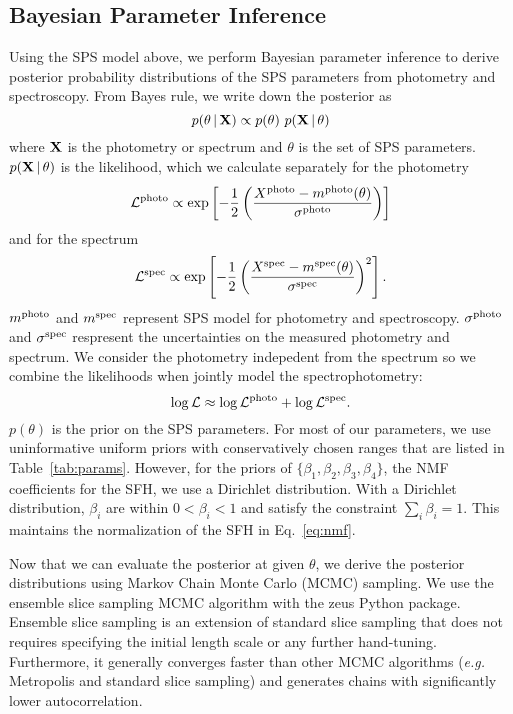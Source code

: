 \subsection{Bayesian Parameter Inference} \label{sec:infer} 
Using the SPS model above, we perform Bayesian parameter inference to derive
posterior probability distributions of the SPS parameters from photometry and
spectroscopy. 
From Bayes rule, we write down the posterior as
\begin{equation} \label{eq:bayes}
    p(\theta\given {\bf X}) \propto p(\theta)~p({\bf X} \given \theta)
\end{equation}
where ${\bf X}$ is the photometry or spectrum and $\theta$ is the set of SPS
parameters. 
$p({\bf X} \,|\, \theta)$ is the likelihood, which we calculate separately for
the photometry
\begin{equation}
    \mathcal{L}^{\rm photo} \propto \exp\left[-\frac{1}{2} \left(\frac{X^{\rm photo} -
    m^{\rm photo}(\theta)}{\sigma^{\rm photo}}\right)\right]
\end{equation}
and for the spectrum
\begin{equation}
    \mathcal{L}^{\rm spec} \propto \exp\left[-\frac{1}{2} \left(\frac{X^{\rm spec} -
    m^{\rm spec}(\theta)}{\sigma^{\rm spec}} \right)^2\right].
\end{equation}
$m^{\rm photo}$ and $m^{\rm spec}$ represent SPS model for photometry and
spectroscopy. 
$\sigma^{\rm photo}$ and $\sigma^{\rm spec}$ respresent the uncertainties on
the measured photometry and spectrum. 
We consider the photometry indepedent from the spectrum so we combine the
likelihoods when jointly model the spectrophotometry: 
\begin{equation}
    \log \mathcal{L} \approx \log \mathcal{L}^{\rm photo} + \log
    \mathcal{L}^{\rm spec}.
\end{equation}
$p(\theta)$ is the prior on the SPS parameters. 
For most of our parameters, we use uninformative uniform priors with
conservatively chosen ranges that are listed in Table~\ref{tab:params}. 
However, for the priors of $\{\beta_1, \beta_2, \beta_3, \beta_4 \}$, the NMF coefficients
for the SFH, we use a Dirichlet distribution.  
With a Dirichlet distribution, $\beta_i$ are within $0 < \beta_i < 1$ and
satisfy the constraint $\sum_i \beta_i = 1$. 
This maintains the normalization of the SFH in Eq.~\ref{eq:nmf}. 

Now that we can evaluate the posterior at given $\theta$, we derive the
posterior distributions using Markov Chain Monte Carlo (MCMC) sampling. 
We use the \cite{karamanis2020} ensemble slice sampling MCMC algorithm with the
{\sc zeus} Python package. 
Ensemble slice sampling is an extension of standard slice sampling that does
not requires specifying the initial length scale or any further hand-tuning.
Furthermore, it generally converges faster than other MCMC algorithms
(\emph{e.g.} Metropolis and standard slice sampling) and generates chains with
significantly lower autocorrelation.

